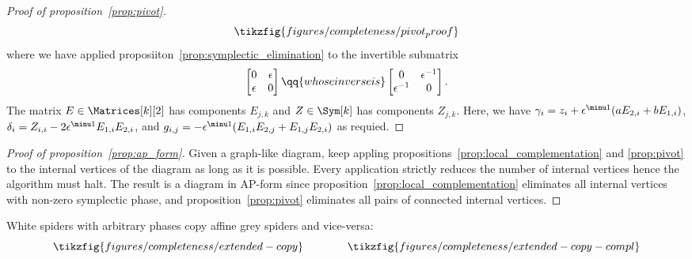 \begin{proof}[Proof of proposition~\ref{prop:pivot}]
  \begin{equation}
    \tikzfig{figures/completeness/pivot_proof}
  \end{equation}
  where we have applied proposiiton~\ref{prop:symplectic_elimination} to the invertible submatrix
  \begin{equation}
    \begin{bmatrix} 0 & \epsilon \\ \epsilon & 0 \end{bmatrix}
    \qq{whose inverse is}
    \begin{bmatrix} 0 & \epsilon^{-1} \\ \epsilon^{-1} & 0 \end{bmatrix}.
  \end{equation}
  The matrix \(E \in \Matrices[k][2]\) has components \(E_{j,k}\) and \(Z
  \in \Sym[k]\) has components \(Z_{j,k}\).  Here, we have
  \(\gamma_i = z_i + \epsilon^{\minu 1} (a E_{2,i} + b E_{1,i})\),
  \(\delta_i = Z_{i,i} - 2 \epsilon^{\minu 1} E_{1,i} E_{2,i}\),
  and \(g_{i,j} = - \epsilon^{\minu 1} (E_{1,i} E_{2,j} + E_{1,j} E_{2,i})\) as requied.
\end{proof}
\begin{proof}[Proof of proposition~\ref{prop:ap_form}]
  Given a graph-like diagram, keep appling
  propositions~\ref{prop:local_complementation} and \ref{prop:pivot} to
  the internal vertices of the diagram as long as it is possible. Every
  application strictly reduces the number of internal vertices hence
  the algorithm must halt. The result is a diagram in AP-form since
  proposition~\ref{prop:local_complementation} eliminates all internal
  vertices with non-zero symplectic phase, and proposition~\ref{prop:pivot}
  eliminates all pairs of connected internal vertices.
\end{proof}
\begin{lemma}
  \label{lem:pauli_push}
  White spiders with arbitrary phases copy affine grey spiders and vice-versa:
  \begin{equation*}
    \tikzfig{figures/completeness/extended-copy}
    \qquad \qquad
    \tikzfig{figures/completeness/extended-copy-compl}
  \end{equation*}
\end{lemma}
